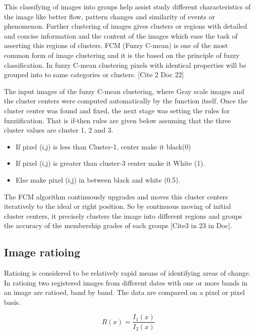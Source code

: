 \documentclass[12pt,a4paper]{article}
\begin{document}
This classifying of images into groups help assist study different characteristics of the image like better flow, pattern changes and similarity of events or phenomenon. Further clustering of images gives clusters or regions with detailed and concise information and the content of the images which ease the task of asserting this regions of clusters. FCM (Fuzzy C-mean) is one of the most common form of image clustering and it is the based on the principle of fuzzy classification. In fuzzy C-mean clustering pixels with identical properties will be grouped into to same categories or clusters. [Cite 2 Doc 22]

The input images of the fuzzy C-mean clustering, where Gray scale images and the cluster centers were computed automatically by the function itself. Once the cluster center was found and fixed, the next stage was setting the rules for fuzziification. That is if-then rules are given below assuming that the three cluster values are cluster 1, 2 and 3.
\begin{itemize}
	
	\item If pixel (i,j) is less than Cluster-1, center make it black(0)
	\item If pixel (i,j) is greater than cluster-3 center make it White (1).
	\item Else make pixel (i,j) in between black and white (0.5). 	
\end{itemize}

The FCM algorithm continuously upgrades and moves this cluster centers iteratively to the ideal or right position. So by continuous moving of initial cluster centers, it precisely clusters the image into different regions and groups the accuracy of the membership grades of each groups [Cite3 in 23 in Doc]. 


\subsection[3.3]{Image ratioing}
Ratioing is considered to be relatively rapid means of identifying areas of change. In ratioing two registered images from different dates with one or more bands in an image are ratioed, band by band. The data are compared on a pixel or pixel basis. 

\begin{equation}
R(x) = \frac{I_{1}(x)}{I_{2}(x)}
\end{equation}
\end{document}
